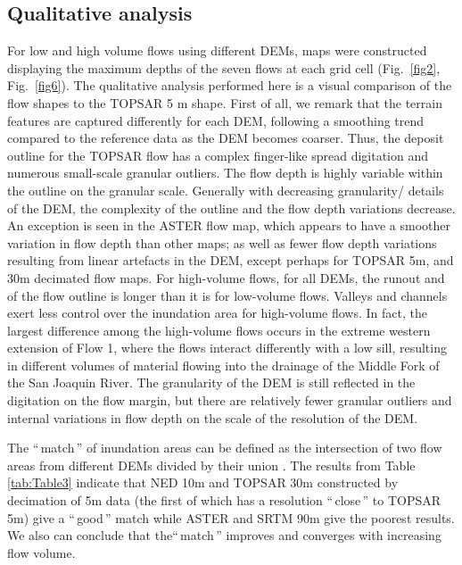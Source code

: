 \documentclass[12pt,letterpaper]{article}
\begin{document}
\subsection{Qualitative analysis} 
For low and high volume flows using different DEMs, maps were
constructed displaying the maximum depths of the seven flows at each
grid cell (Fig.~\ref{fig2}, Fig.~\ref{fig6}).  The qualitative
analysis performed here is a visual comparison of the flow shapes to
the TOPSAR 5 m shape.  First of all, we remark that the terrain
features are captured differently for each DEM, following a smoothing
trend compared to the reference data as the DEM becomes coarser.  Thus, the deposit outline for the
TOPSAR flow has a complex finger-like spread digitation and numerous 
small-scale granular outliers.  The flow depth is highly variable within the 
outline on the granular scale.  Generally with decreasing granularity/
details of the DEM, the complexity of the outline and the flow depth variations
decrease.  An exception
is seen in the ASTER flow map, which appears to have a smoother
variation in flow depth than other maps; as well as fewer flow depth
variations resulting from linear artefacts in the DEM, except perhaps
for TOPSAR 5m, and 30m decimated flow maps.  %
For high-volume flows, for all DEMs, the runout and of the flow outline 
is longer than it is for low-volume flows. Valleys and channels exert less control over the
inundation area for high-volume flows. %
In fact, the largest difference among the high-volume flows occurs in the
extreme western extension of Flow 1, where the flows interact
differently with a low sill, resulting in different volumes of
material flowing into the drainage of the Middle Fork of the San
Joaquin River.  The granularity of the DEM is still reflected in the
digitation on the flow margin, but there are relatively fewer granular
outliers and internal variations in flow depth on the scale of the
resolution of the DEM.

The ``\,match\,'' of inundation areas can be defined as the
intersection of two flow areas from different DEMs divided by their
union \citep{Galas2007}. The results from Table \ref{tab:Table3}
indicate that NED 10m and TOPSAR 30m constructed by decimation of 5m
data (the first of which has a resolution ``\,close\,'' to TOPSAR 5m)
give a ``\,good\,'' match while ASTER and SRTM 90m give the poorest
results. We also can conclude that the``\,match\,'' improves and
converges with increasing flow volume.
\end{document}
